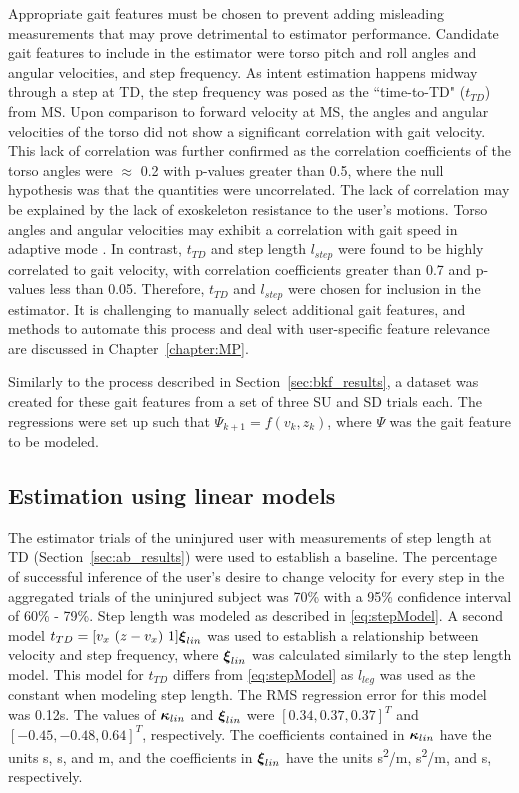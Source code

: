 Appropriate gait features must be chosen to prevent adding misleading measurements that may prove detrimental to estimator performance. Candidate gait features to include in the estimator were torso pitch and roll angles and angular velocities, and step frequency. As intent estimation happens midway through a step at TD, the step frequency was posed as the ``time-to-TD" ($ t_{TD} $) from MS. Upon comparison to forward velocity at MS, the angles and angular velocities of the torso did not show a significant correlation with gait velocity. This lack of correlation was further confirmed as the correlation coefficients of the torso angles were $ \approx $ 0.2 with p-values greater than 0.5, where the null hypothesis was that the quantities were uncorrelated. The lack of correlation may be explained by the lack of exoskeleton resistance to the user's motions. Torso angles and angular velocities may exhibit a correlation with gait speed in adaptive mode \cite{suzuki2007intention}. In contrast, $ t_{TD} $ and step length $ l_{step} $ were found to be highly correlated to gait velocity, with correlation coefficients greater than 0.7 and p-values less than 0.05. Therefore, $ t_{TD} $ and $ l_{step} $ were chosen for inclusion in the estimator. It is challenging to manually select additional gait features, and methods to automate this process and deal with user-specific feature relevance are discussed in Chapter~\ref{chapter:MP}.

Similarly to the process described in Section~\ref{sec:bkf_results}, a dataset was created for these gait features from a set of three SU and SD trials each. The regressions were set up such that $ \Psi_{k+1} = f(v_k,z_k) $, where $ \Psi $ was the gait feature to be modeled.

\subsection{Estimation using linear models}\label{sec:linear}

The estimator trials of the uninjured user with measurements of step length at TD (Section~\ref{sec:ab_results}) were used to establish a baseline. The percentage of successful inference of the user's desire to change velocity for every step in the aggregated trials of the uninjured subject was 70\% with a 95\% confidence interval of 60\% - 79\%. Step length was modeled as described in \eqref{eq:stepModel}. A second model $t_{TD} =  [v_x\ (z - v_x)\ 1] \boldsymbol{\xi}_{lin}$ was used to establish a relationship between velocity and step frequency, where $ \boldsymbol{\xi}_{lin} $ was calculated similarly to the step length model. This model for $ t_{TD} $ differs from \eqref{eq:stepModel} as $ l_{leg} $ was used as the constant when modeling step length. The RMS regression error for this model was 0.12s. The values of $ \boldsymbol{\kappa}_{lin} $ and $ \boldsymbol{\xi}_{lin} $ were $[0.34 ,0.37 ,0.37]^T$ and $ [-0.45 ,-0.48 ,0.64]^T $, respectively. The coefficients contained in $ \boldsymbol{\kappa}_{lin} $ have the units s, s, and m, and the coefficients in $ \boldsymbol{\xi}_{lin} $ have the units s\textsuperscript{2}/m, s\textsuperscript{2}/m, and s, respectively.

